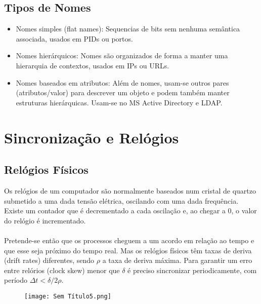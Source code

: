 \documentclass[10pt,a4paper]{report}
\begin{document}
\section{Tipos de Nomes}
\begin{itemize}
\item Nomes simples (flat names): Sequencias de bits sem nenhuma semântica associada, usados em PIDs ou portos.
\item Nomes hierárquicos: Nomes são organizados de forma a manter uma hierarquia de contextos, usados em IPs ou URLs.
\item Nomes baseados em atributos: Além de nomes, usam-se outros pares (atributos/valor) para descrever um objeto e podem também manter estruturas hierárquicas. Usam-se no MS Active Directory e LDAP.
\end{itemize}

\chapter{Sincronização e Relógios}
\section{Relógios Físicos}
Os relógios de um computador são normalmente baseados num cristal de quartzo submetido a uma dada tensão elétrica, oscilando com uma dada frequência.\\
Existe um contador que é decrementado a cada oscilação e, ao chegar a 0, o valor do relógio é incrementado.\\
\\
Pretende-se então que os processos cheguem a um acordo em relação ao tempo e que esse seja próximo do tempo real. Mas os relógios físicos têm taxas de deriva (drift rates) diferentes, sendo $\rho$ a taxa de deriva máxima. Para garantir um erro entre relórios (clock skew) menor que $\delta$ é preciso sincronizar periodicamente, com período $\Delta t < \delta/2\rho$.
\begin{figure}[H]
\centering
\texttt{[image: Sem Título5.png]}
\end{figure}
\end{document}
